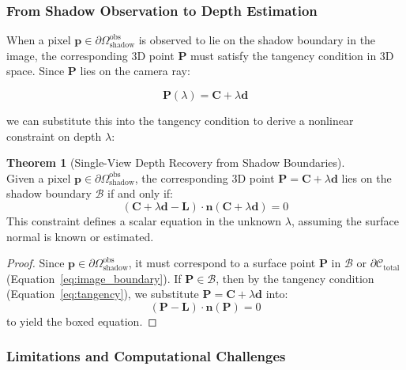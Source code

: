 \documentclass[12pt]{article}
\newcommand{\vect}[1]{\bm{#1}}
\theoremstyle{definition}
\newtheorem{theorem}{Theorem}[subsection]
\begin{document}
\newpage

\subsubsection*{From Shadow Observation to Depth Estimation} \label{sec:shadow_depth}

When a pixel $\vect{p} \in \partial\Omega_{\text{shadow}}^{\text{obs}}$ is observed to lie on the shadow boundary in the image, the corresponding 3D point $\vect{P}$ must satisfy the tangency condition in 3D space. Since $\vect{P}$ lies on the camera ray:

\[
\vect{P}(\lambda) = \vect{C} + \lambda \vect{d}
\]

we can substitute this into the tangency condition to derive a nonlinear constraint on depth $\lambda$:

\begin{theorem}[Single-View Depth Recovery from Shadow Boundaries] \label{thm:depth_from_shadow} ~\\
Given a pixel $\vect{p} \in \partial\Omega_{\text{shadow}}^{\text{obs}}$, the corresponding 3D point $\vect{P} = \vect{C} + \lambda \vect{d}$ lies on the shadow boundary $\mathcal{B}$ if and only if:
\begin{equation}
\boxed{(\vect{C} + \lambda \vect{d} - \vect{L}) \cdot \vect{n}(\vect{C} + \lambda \vect{d}) = 0} \label{eq:shadow_depth_constraint}
\end{equation}
This constraint defines a scalar equation in the unknown $\lambda$, assuming the surface normal is known or estimated.
\end{theorem}

\begin{proof}
Since $\vect{p} \in \partial\Omega_{\text{shadow}}^{\text{obs}}$, it must correspond to a surface point $\vect{P}$ in $\mathcal{B}$ or $\partial\mathcal{C}_{\text{total}}$ (Equation~\eqref{eq:image_boundary}). If $\vect{P} \in \mathcal{B}$, then by the tangency condition (Equation~\eqref{eq:tangency}), we substitute $\vect{P} = \vect{C} + \lambda \vect{d}$ into:
\[
(\vect{P} - \vect{L}) \cdot \vect{n}(\vect{P}) = 0
\]
to yield the boxed equation.
\end{proof}

\subsubsection*{Limitations and Computational Challenges} \label{sec:shadow_limitations}
\end{document}
